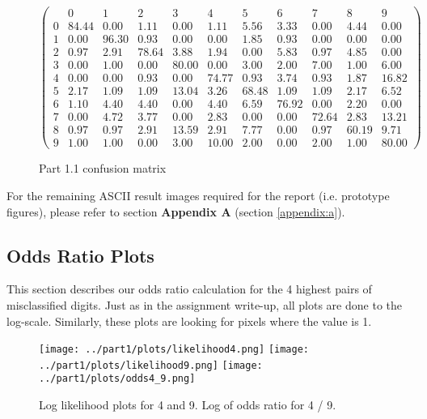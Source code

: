 \documentclass[10pt,a4paper]{article}
\begin{document}
\begin{figure}[h]
\centering
\[
\left(
\begin{array}{c|cccccccccc}
 & 0 & 1 & 2 & 3 & 4 & 5 & 6 & 7 & 8 & 9 \\
\hline
0 & 84.44  & 0.00   & 1.11  & 0.00   & 1.11  & 5.56  & 3.33  & 0.00  & 4.44  & 0.00 \\
1 & 0.00   & 96.30  & 0.93  & 0.00   & 0.00  & 1.85  & 0.93  & 0.00  & 0.00  & 0.00 \\
2 & 0.97   & 2.91   & 78.64 & 3.88   & 1.94  & 0.00  & 5.83  & 0.97  & 4.85  & 0.00 \\
3 & 0.00   & 1.00   & 0.00  & 80.00  & 0.00  & 3.00  & 2.00  & 7.00  & 1.00  & 6.00 \\
4 & 0.00   & 0.00   & 0.93  & 0.00   & 74.77 &  0.93 & 3.74  & 0.93  & 1.87  & 16.82 \\
5 & 2.17   & 1.09   & 1.09  & 13.04  & 3.26  & 68.48 & 1.09  & 1.09  & 2.17  & 6.52 \\
6 & 1.10   & 4.40   & 4.40  & 0.00   & 4.40  & 6.59  & 76.92 & 0.00  & 2.20  & 0.00 \\
7 & 0.00   & 4.72   & 3.77  & 0.00   & 2.83  & 0.00  & 0.00  & 72.64 & 2.83  & 13.21 \\
8 & 0.97   & 0.97   & 2.91  & 13.59  & 2.91  & 7.77  & 0.00  & 0.97  & 60.19 & 9.71 \\
9 & 1.00   & 1.00   & 0.00  & 3.00   & 10.00 & 2.00  & 0.00  & 2.00  & 1.00  & 80.00
\end{array}
\right)
\]
\caption{Part 1.1 confusion matrix}
\label{fig:confusionMatrix}
\end{figure}

For the remaining ASCII result images required for the report (i.e. prototype figures), please refer to section \textbf{Appendix A} (section \ref{appendix:a}).

\subsection{Odds Ratio Plots}
This section describes our odds ratio calculation for the 4 highest pairs of misclassified digits. Just as in the assignment write-up, all plots are done to the log-scale. Similarly, these plots are looking for pixels where the value is 1.

\begin{figure}[h]
\hspace*{-1.5in}
\texttt{[image: ../part1/plots/likelihood4.png]}%
\texttt{[image: ../part1/plots/likelihood9.png]}%
\texttt{[image: ../part1/plots/odds4\_9.png]}
\caption{Log likelihood plots for 4 and 9. Log of odds ratio for 4 / 9.}
\label{fig:odds4_9}
\end{figure}
\end{document}

